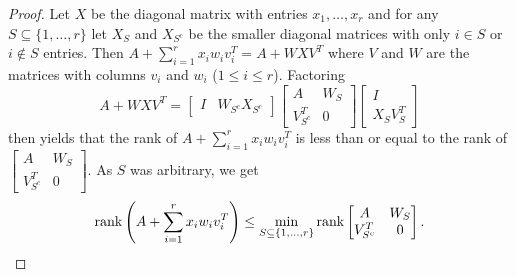 \documentclass{amsart}
\theoremstyle{definition}
\begin{document}
\begin{proof}
Let $X$ be the diagonal matrix with entries $x_1, \ldots, x_r$ and for any $S \subseteq \{1, \ldots, r\}$ let $X_S$ and $X_{S^c}$ be the smaller diagonal matrices with only $i \in S$ or $i \not\in S$ entries. Then $A + \sum_{i=1}^r x_iw_iv_i^T = A + WXV^T$ where $V$ and $W$ are the matrices with columns $v_i$ and $w_i$ ($1 \leq i \leq r$). Factoring $$A + WXV^T = \left[\begin{matrix}I& W_{S^c}X_{S^c}\end{matrix}\right]\left[\begin{matrix}A& W_S\\ V_{S^c}^T&0\end{matrix}\right]\left[\begin{matrix}I\\ X_SV_S^T\end{matrix}\right]$$ then yields that the rank of $A + \sum_{i=1}^r x_iw_iv_i^T$ is less than or equal to the rank of $\left[\begin{matrix} A&W_S\\ V_{S^c}^T&0\end{matrix}\right]$. As $S$ was arbitrary, we get $${\rm rank}\left(A + \sum_{i=1}^r x_iw_iv_i^T\right) \leq \min_{S \subseteq \{1, \ldots, r\}} {\rm rank} \left[\begin{matrix} A&W_S\\ V_{S^c}^T&0\end{matrix}\right].$$


\end{proof}
\end{document}
